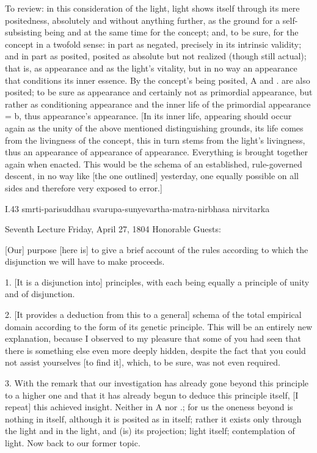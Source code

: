 To review: in this consideration of the light,
light shows itself through its mere positedness,
absolutely and without anything further,
as the ground for a self-subsisting being
and at the same time for the concept;
and, to be sure, for the concept in a twofold sense:
in part as negated, precisely in its intrinsic validity;
and in part as posited, posited as absolute
but not realized (though still actual);
that is, as appearance and as the light’s vitality,
but in no way an appearance that conditions its inner essence.
By the concept’s being posited,
A and . are also posited;
to be sure as appearance
and certainly not as primordial appearance,
but rather as conditioning appearance
and the inner life of the primordial appearance = b,
thus appearance’s appearance.
[In its inner life,
appearing should occur again as
the unity of the above mentioned distinguishing grounds,
its life comes from the livingness of the concept,
this in turn stems from the light’s livingness,
thus an appearance of appearance of appearance.
Everything is brought together again when enacted.
This would be the schema of
an established, rule-governed descent,
in no way like [the one outlined] yesterday,
one equally possible on all sides
and therefore very exposed to error.]

I.43
smrti-parisuddhau svarupa-sunyevartha-matra-nirbhasa nirvitarka

Seventh Lecture
Friday, April 27, 1804
Honorable Guests:

[Our] purpose [here is] to give a brief account of
the rules according to which the disjunction
we will have to make proceeds.

1. [It is a disjunction into] principles,
with each being equally a principle
of unity and of disjunction.

2. [It provides a deduction from this to a general]
schema of the total empirical domain
according to the form of its genetic principle.
This will be an entirely new explanation,
because I observed to my pleasure that
some of you had seen that there is
something else even more deeply hidden,
despite the fact that you could not
assist yourselves [to find it],
which, to be sure, was not even required.

3. With the remark that our investigation has
already gone beyond this principle to a higher one
and that it has already begun to deduce this principle itself,
[I repeat] this achieved insight.
Neither in A nor .;
for us the oneness beyond is nothing in itself,
although it is posited as in itself;
rather it exists only through the light
and in the light, and (is) its projection;
light itself; contemplation of light.
Now back to our former topic.

